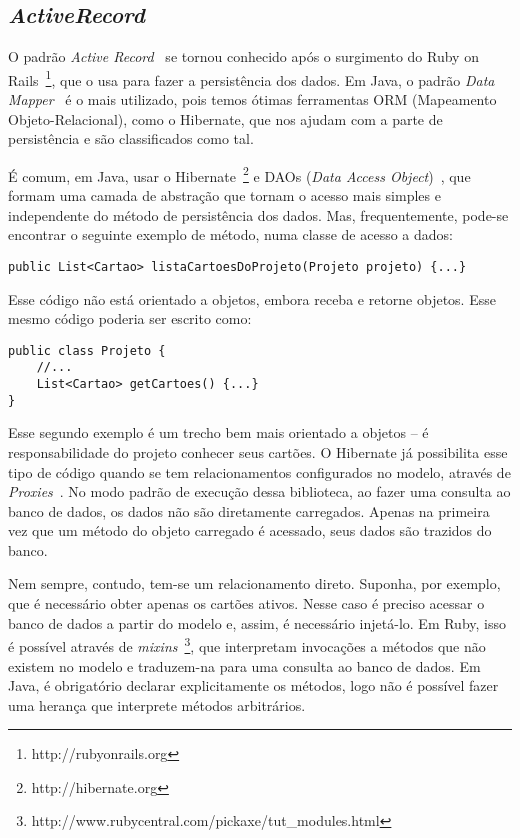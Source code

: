 \subsection{\textit{ActiveRecord}}

O padrão \textit{Active Record}~\cite{fowler} se tornou conhecido após o surgimento do Ruby on Rails~\footnote{http://rubyonrails.org}, que o usa para fazer a persistência dos dados. Em Java, o padrão \textit{Data Mapper}~\cite{fowler} é o mais utilizado, pois temos ótimas ferramentas ORM (Mapeamento Objeto-Relacional), como o Hibernate, que nos ajudam com a parte de persistência e são classificados como tal.

É comum, em Java, usar o Hibernate~\footnote{http://hibernate.org} e DAOs (\textit{Data Access Object})~\cite{dao}, que formam uma camada de abstração que tornam o acesso mais simples e independente do método de persistência dos dados. Mas, frequentemente, pode-se encontrar o seguinte exemplo de método, numa classe de acesso a dados:

\begin{lstlisting}
public List<Cartao> listaCartoesDoProjeto(Projeto projeto) {...}
\end{lstlisting}

Esse código não está orientado a objetos, embora receba e retorne objetos. Esse mesmo código poderia ser escrito como:

\begin{lstlisting}
public class Projeto {
	//...
	List<Cartao> getCartoes() {...}
}
\end{lstlisting}

Esse segundo exemplo é um trecho bem mais orientado a objetos -- é responsabilidade do projeto conhecer seus cartões. O Hibernate já possibilita esse tipo de código quando se tem relacionamentos configurados no modelo, através de \textit{Proxies}~\cite{gof}. No modo padrão de execução dessa biblioteca, ao fazer uma consulta ao banco de dados, os dados não são diretamente carregados. Apenas na primeira vez que um método do objeto carregado é acessado, seus dados são trazidos do banco. 

Nem sempre, contudo, tem-se um relacionamento direto. Suponha, por exemplo, que é necessário obter apenas os cartões ativos. Nesse caso é preciso acessar o banco de dados a partir do modelo e, assim, é necessário injetá-lo. Em Ruby, isso é possível através de \textit{mixins}~\footnote{http://www.rubycentral.com/pickaxe/tut\_modules.html}, que interpretam invocações a métodos que não existem no modelo e traduzem-na para uma consulta ao banco de dados. Em Java, é obrigatório declarar explicitamente os métodos, logo não é possível fazer uma herança que interprete métodos arbitrários.

